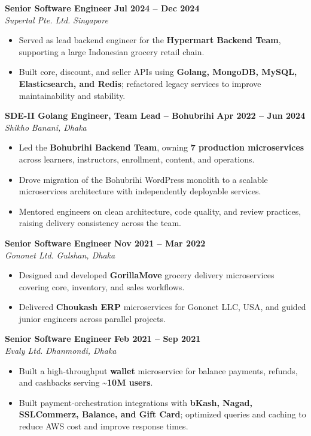 \documentclass[10pt,a4paper]{article}
\newcommand{\roleentry}[4]{%
  \textbf{#1} \hfill \textbf{#2}\\
  \textit{#3} \hfill \textit{#4}\par\vspace{-0.12em}
}
\newenvironment{cvitems}{%
  \begin{itemize}
    \setlength{\itemsep}{0.03em}
    \setlength{\parskip}{0pt}
    \setlength{\parsep}{0pt}
    \setlength{\topsep}{0.08em}
    \setlength{\leftmargin}{1.2em}
}{\end{itemize}}
\begin{document}
\roleentry{Senior Software Engineer}{Jul 2024 -- Dec 2024}{Supertal Pte. Ltd.}{Singapore}
\begin{cvitems}
  \item Served as lead backend engineer for the \textbf{Hypermart Backend Team}, supporting a large Indonesian grocery retail chain.
  \item Built core, discount, and seller APIs using \textbf{Golang, MongoDB, MySQL, Elasticsearch, and Redis}; refactored legacy services to improve maintainability and stability.
\end{cvitems}

\roleentry{SDE-II Golang Engineer, Team Lead -- Bohubrihi}{Apr 2022 -- Jun 2024}{Shikho}{Banani, Dhaka}
\begin{cvitems}
  \item Led the \textbf{Bohubrihi Backend Team}, owning \textbf{7 production microservices} across learners, instructors, enrollment, content, and operations.
  \item Drove migration of the Bohubrihi WordPress monolith to a scalable microservices architecture with independently deployable services.
  \item Mentored engineers on clean architecture, code quality, and review practices, raising delivery consistency across the team.
\end{cvitems}

\roleentry{Senior Software Engineer}{Nov 2021 -- Mar 2022}{Gononet Ltd.}{Gulshan, Dhaka}
\begin{cvitems}
  \item Designed and developed \textbf{GorillaMove} grocery delivery microservices covering core, inventory, and sales workflows.
  \item Delivered \textbf{Choukash ERP} microservices for Gononet LLC, USA, and guided junior engineers across parallel projects.
\end{cvitems}

\roleentry{Senior Software Engineer}{Feb 2021 -- Sep 2021}{Evaly Ltd.}{Dhanmondi, Dhaka}
\begin{cvitems}
  \item Built a high-throughput \textbf{wallet} microservice for balance payments, refunds, and cashbacks serving \textbf{\textasciitilde{}10M users}.
  \item Built payment-orchestration integrations with \textbf{bKash, Nagad, SSLCommerz, Balance, and Gift Card}; optimized queries and caching to reduce AWS cost and improve response times.
\end{cvitems}
\end{document}
